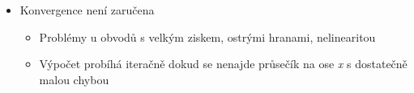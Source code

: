 \begin{itemize}
	\begin{itemize}
		\item Na počátku se zvolí bod $U_0^{(1)}$, pak $U_0^{(2)}$
		\item Výpočet probíhá iteračně dokud se nenajde průsečík na ose \textit{x} s dostatečně malou chybou
	\end{itemize}
	\item Konvergence není zaručena
	\begin{itemize}
		\item Problémy u obvodů s velkým ziskem, ostrými hranami, nelinearitou
		\item Výpočet probíhá iteračně dokud se nenajde průsečík na ose \textit{x} s dostatečně malou chybou
	\end{itemize}
\end{itemize}


